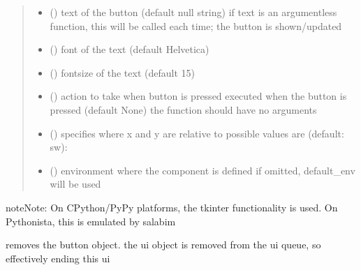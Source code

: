 \documentclass[letterpaper,10pt,english]{sphinxmanual}
\begin{document}
\begin{fulllineitems}
\begin{quote}
\begin{description}
\begin{itemize}
\item {} 
 () \textendash{} text of the button (default null string) 
if text is an argumentless function, this will be called each time;
the button is shown/updated

\item {} 
 () \textendash{} font of the text (default Helvetica)

\item {} 
 () \textendash{} fontsize of the text (default 15)

\item {} 
 () \textendash{} action to take when button is pressed 
executed when the button is pressed (default None)
the function should have no arguments 

\item {} 
 () \textendash{} specifies where x and y are relative to 
possible values are (default: sw): 

\item {} 
 ({\hyperref[\detokenize{Reference:salabim.Environment}]{}}) \textendash{} environment where the component is defined 
if omitted, default\_env will be used

\end{itemize}

\end{description}\end{quote}

\begin{sphinxadmonition}{note}{Note:}
On CPython/PyPy platforms, the tkinter functionality is used.
On Pythonista, this is emulated by salabim
\end{sphinxadmonition}

\begin{fulllineitems}
\label{\detokenize{Reference:salabim.AnimateButton.remove}}
removes the button object. 
the ui object is removed from the ui queue,
so effectively ending this ui

\end{fulllineitems}


\end{fulllineitems}
\end{document}
